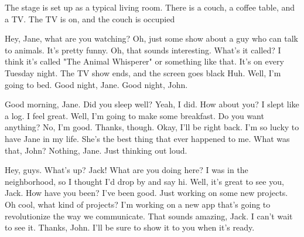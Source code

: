 \BlockStageDirection The stage is set up as a typical living room. There is a couch, a coffee table, and a TV. The TV is on, and the couch is occupied

  Hey, Jane, what are you watching?
  Oh, just some show about a guy who can talk to animals. It's pretty funny.
  Oh, that sounds interesting. What's it called?
  I think it's called "The Animal Whisperer" or something like that. It's on every Tuesday night.
\BlockStageDirection The TV show ends, and the screen goes black
 Huh.
  Well, I'm going to bed. Good night, Jane.
  Good night, John.

  Good morning, Jane. Did you sleep well?
  Yeah, I did. How about you?
  I slept like a log. I feel great.
  Well, I'm going to make some breakfast. Do you want anything?
  No, I'm good. Thanks, though.
  Okay, I'll be right back.
  I'm so lucky to have Jane in my life. She's the best thing that ever happened to me.
  What was that, John?
  Nothing, Jane. Just thinking out loud.

  Hey, guys. What's up?
  Jack! What are you doing here?
  I was in the neighborhood, so I thought I'd drop by and say hi.
  Well, it's great to see you, Jack. How have you been?
  I've been good. Just working on some new projects.
 Oh cool, what kind of projects?
  I'm working on a new app that's going to revolutionize the way we communicate.
  That sounds amazing, Jack. I can't wait to see it.
  Thanks, John. I'll be sure to show it to you when it's ready.
